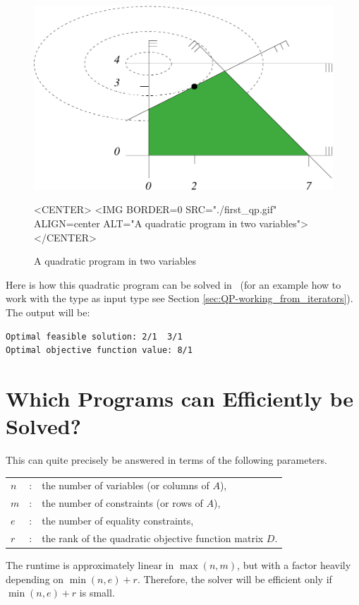 \begin{figure}[htbp]
\begin{ccTexOnly}
\begin{center}
\includegraphics{QP_solver/first_qp} %
\end{center}
\end{ccTexOnly}
\caption{A quadratic program in two variables
\label{fig:QP-first_qp}}

\begin{ccHtmlOnly}
<CENTER>
<IMG BORDER=0 SRC="./first_qp.gif" ALIGN=center ALT="A quadratic program in two variables">
</CENTER>
\end{ccHtmlOnly}
\end{figure}

Here is how this quadratic program can be solved in \cgal\ (for an example
how to work with the type  as input type see Section 
\ref{sec:QP-working_from_iterators}).
The output will be:
\begin{verbatim}
Optimal feasible solution: 2/1  3/1
Optimal objective function value: 8/1
\end{verbatim}



\section{Which Programs can Efficiently be Solved?}
\label{sec:QP-efficiency}
This can quite precisely be answered in terms of the following
parameters.
\begin{tabular}{lcl}
$n$ &: & the number of variables (or columns of $A$),\\
$m$ &: &the number of constraints (or rows of $A$),\\
$e$ &: &the number of equality constraints,\\
$r$ &: &the rank of the quadratic objective function matrix $D$.
\end{tabular}
The runtime is approximately linear in $\max(n,m)$, 
but with a factor heavily depending on $\min(n,e)+r$.
Therefore, the solver will be efficient only if $\min(n,e)+r$ is small.

